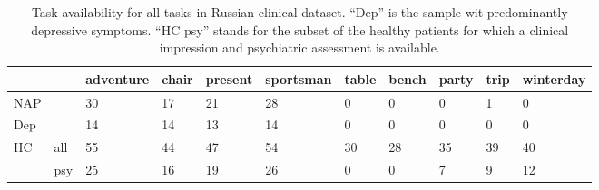 \begin{table}[h!]
\begin{center}
\begin{tabular}{lllllll}
\hline
    &     & adventure & chair & present & sportsman & table & bench & party & trip & winterday \\ \hline
NAP &     & 30        & 17    & 21      & 28        & 0     & 0     & 0     & 1    & 0         \\
Dep &     & 14        & 14    & 13      & 14        & 0     & 0     & 0     & 0    & 0         \\
HC  & all & 55        & 44    & 47      & 54        & 30    & 28    & 35    & 39   & 40        \\
    & psy & 25        & 16    & 19      & 26        & 0     & 0     & 7     & 9    & 12        \\ \hline
\end{tabular}
\captionsetup{width=\textwidth}
\caption[Russian Clinical Dataset: Task Availability]{\label{tab:data:ru:full_sample:tasks} Task availability for all tasks in Russian clinical dataset. ``Dep'' is the sample wit predominantly depressive symptoms. ``HC psy'' stands for the subset of the healthy patients for which a clinical impression and psychiatric assessment is available.}
\end{center}
\end{table}